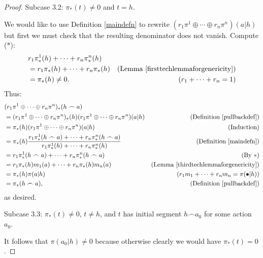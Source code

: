 \documentclass[runningheads]{llncs}
\begin{document}
\begin{proof}
    Subcase 3.2: $\pi_*(t)\not=0$ and $t=h$.

    We would like to use Definition \ref{maindefn} to rewrite
    $(r_1\pi^1\oplus\cdots\oplus r_n\pi^n)(a|h)$ but first we must check
    that the resulting denominator does not vanish.
    Compute ($*$):
    \begin{align*}
        &{} r_1\pi^1_*(h)+\cdots+r_n\pi^n_*(h)\\
            &= r_1\pi_*(h)+\cdots+r_n\pi_*(h)
                &\mbox{(Lemma \ref{firsttechlemmaforgenericity})}\\
            &= \pi_*(h)\not=0.
                &\mbox{($r_1+\cdots+r_n=1$)}
    \end{align*}
    Thus:
    \begin{align*}
        &{} (r_1\pi^1\oplus\cdots\oplus r_n\pi^n)_*(h\frown a)\\
            &= (r_1\pi^1\oplus\cdots\oplus r_n\pi^n)_*(h)
                (r_1\pi^1\oplus\cdots\oplus r_n\pi^n)(a|h)
                    &\mbox{(Definition \ref{pullbackdef})}\\
            &= \pi_*(h)(r_1\pi^1\oplus\cdots\oplus r_n\pi^n)(a|h)
                    &\mbox{(Induction)}\\
            &= \pi_*(h)
                \frac
                {r_1\pi^1_*(h\frown a)+\cdots+r_n\pi^n_*(h\frown a)}
                {r_1\pi^1_*(h)+\cdots+r_n\pi^n_*(h)}
                    &\mbox{(Definition \ref{maindefn})}\\
            &= r_1\pi^1_*(h\frown a)+\cdots+r_n\pi^n_*(h\frown a)
                    &\mbox{(By $*$)}\\
            &= r_1\pi_*(h)m_1(a)+\cdots+r_n\pi_*(h)m_n(a)
                    &\mbox{(Lemma \ref{thirdtechlemmaforgenericity})}\\
            &= \pi_*(h)\pi(a|h)
                    &\mbox{($r_1m_1+\cdots+r_nm_n=\pi(\bullet|h)$)}\\
            &= \pi_*(h\frown a),
                    &\mbox{(Definition \ref{pullbackdef})}
    \end{align*}
    as desired.

    Subcase 3.3: $\pi_*(t)\not=0$, $t\not=h$, and
    $t$ has initial segment $h\frown a_0$ for some action $a_0$.

    It follows that $\pi(a_0|h)\not=0$ because otherwise clearly
    we would have $\pi_*(t)=0$.


\end{proof}
\end{document}
